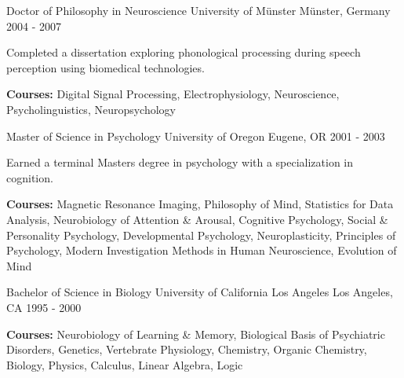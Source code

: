 

\begin{cventries}

  \cventry
    {Doctor of Philosophy in Neuroscience} %
    {University of Münster} %
    {Münster, Germany} %
    {2004 - 2007} %
    {
      \begin{cvitems} %
        \item {Completed a dissertation exploring phonological processing during speech perception using biomedical technologies.}
        \item {\textbf{Courses:} Digital Signal Processing, Electrophysiology, Neuroscience, Psycholinguistics, Neuropsychology}
      \end{cvitems}
    }
    
  \cventry
    {Master of Science in Psychology} %
    {University of Oregon} %
    {Eugene, OR} %
    {2001 - 2003} %
    {
      \begin{cvitems} %
        \item {Earned a terminal Masters degree in psychology with a specialization in cognition.}
        \item {\textbf{Courses:} Magnetic Resonance Imaging, Philosophy of Mind, Statistics for Data Analysis, Neurobiology of Attention \& Arousal, Cognitive Psychology, Social \& Personality Psychology, Developmental Psychology, Neuroplasticity, Principles of Psychology, Modern Investigation Methods in Human Neuroscience, Evolution of Mind}
      \end{cvitems}
    }
    
  \cventry
    {Bachelor of Science in Biology} %
    {University of California Los Angeles} %
    {Los Angeles, CA} %
    {1995 - 2000} %
    {
      \begin{cvitems} %
        \item {\textbf{Courses:} Neurobiology of Learning \& Memory, Biological Basis of Psychiatric Disorders, Genetics, Vertebrate Physiology, Chemistry, Organic Chemistry, Biology, Physics, Calculus, Linear Algebra, Logic}
      \end{cvitems}
    }
\end{cventries}
